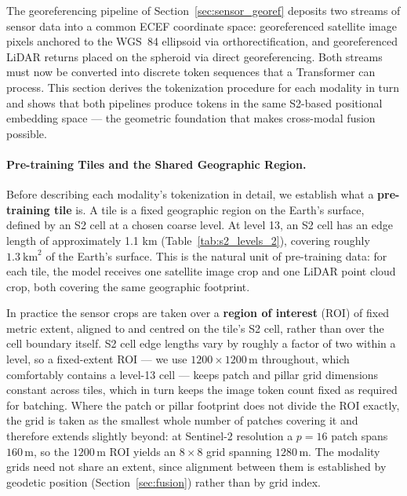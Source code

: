 \documentclass{book}
\begin{document}
The georeferencing pipeline of Section~\ref{sec:sensor_georef}
deposits two streams of sensor data into a common ECEF coordinate
space: georeferenced satellite image pixels anchored to the WGS~84
ellipsoid via orthorectification, and georeferenced LiDAR returns
placed on the spheroid via direct georeferencing.  Both streams must
now be converted into discrete token sequences that a Transformer can
process.  This section derives the tokenization procedure for each
modality in turn and shows that both pipelines produce tokens in the
same S2-based positional embedding space --- the geometric foundation
that makes cross-modal fusion possible.

\paragraph{Pre-training Tiles and the Shared Geographic Region.}

Before describing each modality's tokenization in detail, we
establish what a \textbf{pre-training tile} is.  A tile is a fixed
geographic region on the Earth's surface, defined by an S2 cell at a
chosen coarse level.  At level 13, an S2 cell has an edge length of
approximately 1.1 km (Table~\ref{tab:s2_levels_2}), covering roughly
$1.3\ \text{km}^2$ of the Earth's surface.  This is the natural unit
of pre-training data: for each tile, the model receives one satellite
image crop and one LiDAR point cloud crop, both covering the same
geographic footprint.

In practice the sensor crops are taken over a \textbf{region of
interest} (ROI) of fixed metric extent, aligned to and centred on the
tile's S2 cell, rather than over the cell boundary itself.  S2 cell
edge lengths vary by roughly a factor of two within a level, so a
fixed-extent ROI --- we use $1200 \times 1200$\,m throughout, which
comfortably contains a level-13 cell --- keeps patch and pillar grid
dimensions constant across tiles, which in turn keeps the image token
count fixed as required for batching.  Where the patch or pillar
footprint does not divide the ROI exactly, the grid is taken as the
smallest whole number of patches covering it and therefore extends
slightly beyond: at Sentinel-2 resolution a $p=16$ patch spans
$160$\,m, so the $1200$\,m ROI yields an $8 \times 8$ grid spanning
$1280$\,m.  The modality grids need not share an extent, since
alignment between them is established by geodetic position
(Section~\ref{sec:fusion}) rather than by grid index.
\end{document}

